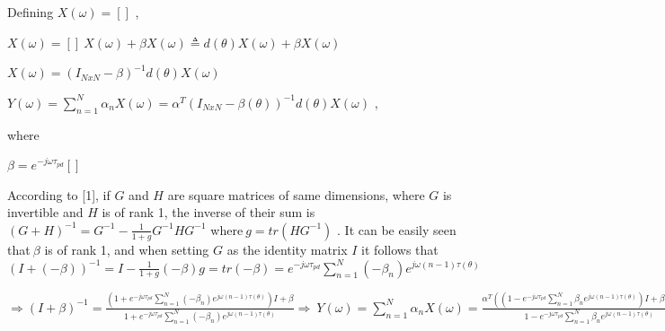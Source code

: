 \documentclass[a4paper,12pt]{report}
\begin{document}
 \par
\noindent 
Defining $ X \left(  \omega  \right) = \left[  \right]  $
 , \par
\noindent 
$ X \left(  \omega  \right) = \left[  \right] ~X \left(  \omega  \right) + \beta X \left(  \omega  \right)  \triangleq d \left(  \theta  \right) X \left(  \omega  \right) + \beta X \left(  \omega  \right)  $
 \par
\noindent 
$ X \left(  \omega  \right) = \left( I_{NxN}- \beta  \right) ^{-1}d \left(  \theta  \right) X \left(  \omega  \right)  $
 \par
\noindent 
\begin{center}$ Y \left(  \omega  \right) = \sum _{n=1}^{N} \alpha _{n}X \left(  \omega  \right) = \alpha ^{T} \left( I_{NxN}- \beta  \left(  \theta  \right)  \right) ^{-1}d \left(  \theta  \right) X \left(  \omega  \right)  $
,\end{center} \par
\noindent 
where \par
\noindent 
$  \beta =e^{-j \omega  \tau_{pd}} \left[  \right]  $
 \par
\vspace{12pt}
\noindent 
According to [1], if $ G $
 and $ H $
 are square matrices of same dimensions, where $ G $
 is invertible and $ H $
 is of rank 1, the inverse of their sum is \vspace{\baselineskip}
$  \left( G+H \right) ^{-1}=G^{-1}-\frac{1}{1+g}G^{-1}HG^{-1} $
where$ ~g=tr \left( HG^{-1} \right)  $
.\vspace{\baselineskip}
It can be easily seen that$ ~ \beta  $
 is of rank 1, and when setting $ G $
 as the identity matrix $ I $
 it follows that\vspace{\baselineskip}
$  \left( I+ \left( - \beta  \right)  \right) ^{-1}=I-\frac{1}{1+g} \left( - \beta  \right) g=tr \left( - \beta  \right) =e^{-j \omega  \tau_{pd}} \sum _{n=1}^{N} \left( - \beta _{n} \right) e^{j \omega  \left( n-1 \right)  \tau \left(  \theta  \right) } $
 \par
\noindent 
$  \Rightarrow  \left( I+ \beta  \right) ^{-1}=\frac{ \left( 1+e^{-j \omega  \tau_{pd}} \sum _{n=1}^{N} \left( - \beta _{n} \right) e^{j \omega  \left( n-1 \right)  \tau \left(  \theta  \right) } \right) I+ \beta }{1+e^{-j \omega  \tau_{pd}} \sum _{n=1}^{N} \left( - \beta _{n} \right) e^{j \omega  \left( n-1 \right)  \tau \left(  \theta  \right) }} \Rightarrow ~Y \left(  \omega  \right) = \sum _{n=1}^{N} \alpha _{n}X \left(  \omega  \right) =\frac{ \alpha ^{T} \left(  \left( 1-e^{-j \omega  \tau_{pd}} \sum _{n=1}^{N} \beta _{n}e^{j \omega  \left( n-1 \right)  \tau \left(  \theta  \right) } \right) I+ \beta  \right) d \left(  \theta  \right) }{1-e^{-j \omega  \tau_{pd}} \sum _{n=1}^{N} \beta _{n}e^{j \omega  \left( n-1 \right)  \tau \left(  \theta  \right) }}X \left(  \omega  \right)  $
\end{document}
